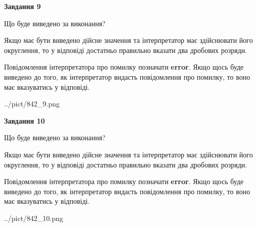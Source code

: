 \documentclass[12pt, ukrainian]{article}
\begin{document}
{\begin {Large}
{\begin {center}\textbf{Завдання 9}\end {center}}\par
Що буде виведено за виконання? \par

Якщо має бути виведено дійсне значення та інтерпретатор має здійснювати його округлення, 
то у відповіді достатньо правильно вказати два дробових розряди.

Повідомлення інтерпретатора про помилку позначати \textbf{error}.
Якщо щось буде виведено до того, як інтерпретатор видасть повідомлення про помилку, 
то воно має вказуватись у відповіді. \par

\begin{center}
	{../pict/842_9.png}
\end{center}
\newpage

{\begin {center}\textbf{Завдання 10}\end {center}}\par
Що буде виведено за виконання? \par

Якщо має бути виведено дійсне значення та інтерпретатор має здійснювати його округлення, 
то у відповіді достатньо правильно вказати два дробових розряди.

Повідомлення інтерпретатора про помилку позначати \textbf{error}.
Якщо щось буде виведено до того, як інтерпретатор видасть повідомлення про помилку, 
то воно має вказуватись у відповіді. \par

\begin{center}
	{../pict/842_10.png}
\end{center}
\newpage

\end {Large}}
\end{document}
